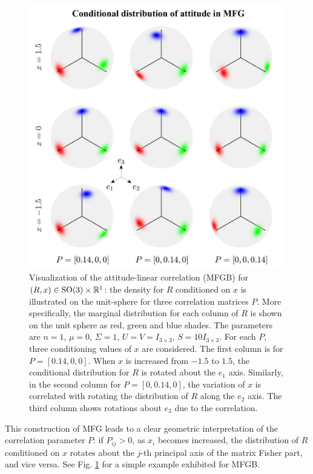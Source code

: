 \begin{figure}
	\centering
	\includegraphics[scale=1.4]{figures/MFG-correlation}
	\caption[Visualization of the attitude-linear correlation (MFGB) for $(R,x)\in\SO{3}\times\mathbb{R}^1$.]{Visualization of the attitude-linear correlation (MFGB) for $(R,x)\in\SO{3}\times\mathbb{R}^1$: the density for $R$ conditioned on $x$ is illustrated on the unit-sphere for three correlation matrices $P$. 
		More specifically, the marginal distribution for each column of $R$ is shown on the unit sphere as red, green and blue shades. 
		The parameters are $n=1$, $\mu=0$, $\Sigma=1$, $U=V=I_{3\times3}$, $S=10I_{3\times3}$.
		For each  $P$, three conditioning values of $x$ are considered. 
		The first column is for $P=[0.14,0,0]$.
		When $x$ is increased from $-1.5$ to $1.5$, the conditional distribution for $R$ is rotated about the $e_1$ axis. 
		Similarly, in the second column for $P=[0,0.14,0]$, the variation of $x$ is correlated with rotating the distribution of $R$ along the $e_2$ axis.
		The third column shows rotations about $e_3$ due to the correlation. \label{fig:MFG-correlation}}
\end{figure}

This construction of MFG leads to a clear geometric interpretation of the correlation parameter $P$:
if $P_{ij} > 0$, as $x_i$ becomes increased, the distribution of $R$ conditioned on $x$ rotates about the $j$-th principal axis of the matrix Fisher part, and vice versa.
See Fig. \ref{fig:MFG-correlation} for a simple example exhibited for MFGB.

